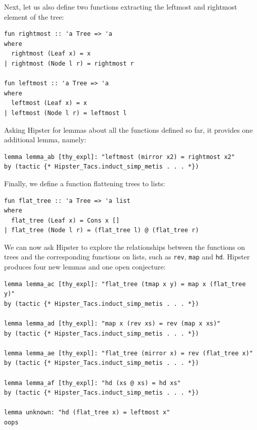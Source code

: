 Next, let us also define two functions extracting the leftmost and rightmost element of the tree:
\begin{small}
\begin{verbatim}
fun rightmost :: 'a Tree => 'a
where 
  rightmost (Leaf x) = x
| rightmost (Node l r) = rightmost r

fun leftmost :: 'a Tree => 'a
where 
  leftmost (Leaf x) = x
| leftmost (Node l r) = leftmost l
\end{verbatim}
\end{small}
Asking Hipster for lemmas about all the functions defined so far, it provides one additional lemma, namely:
\begin{small}
\begin{verbatim}
lemma lemma_ab [thy_expl]: "leftmost (mirror x2) = rightmost x2"
by (tactic {* Hipster_Tacs.induct_simp_metis . . . *})
\end{verbatim}
\end{small}
Finally, we define a function flattening trees to lists:
\begin{small}
\begin{verbatim}
fun flat_tree :: 'a Tree => 'a list
where
  flat_tree (Leaf x) = Cons x []
| flat_tree (Node l r) = (flat_tree l) @ (flat_tree r)
\end{verbatim}
\end{small}
We can now ask Hipster to explore the relationships between the functions on trees and the corresponding functions on lists, such as \texttt{rev}, \texttt{map} and \texttt{hd}. Hipster produces four new lemmas and one open conjecture:
\begin{small}
\begin{verbatim}
lemma lemma_ac [thy_expl]: "flat_tree (tmap x y) = map x (flat_tree y)"
by (tactic {* Hipster_Tacs.induct_simp_metis . . . *})

lemma lemma_ad [thy_expl]: "map x (rev xs) = rev (map x xs)"
by (tactic {* Hipster_Tacs.induct_simp_metis . . . *})

lemma lemma_ae [thy_expl]: "flat_tree (mirror x) = rev (flat_tree x)"
by (tactic {* Hipster_Tacs.induct_simp_metis . . . *})

lemma lemma_af [thy_expl]: "hd (xs @ xs) = hd xs"
by (tactic {* Hipster_Tacs.induct_simp_metis . . . *})

lemma unknown: "hd (flat_tree x) = leftmost x"
oops
\end{verbatim}
\end{small}
